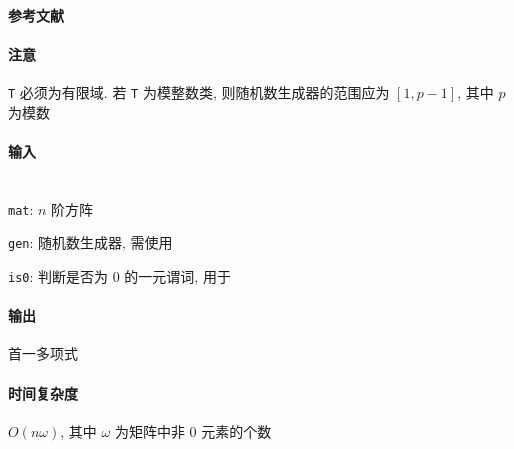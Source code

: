 \paragraph{参考文献} \cite{wiedemann1986solving}

\paragraph{注意} \verb|T| 必须为有限域. 若 \verb|T| 为模整数类, 则随机数生成器的范围应为 \([1, p-1]\), 其中 \(p\) 为模数

\paragraph{输入}~\\

\verb|mat|: \(n\) 阶方阵

\verb|gen|: 随机数生成器, 需使用 

\verb|is0|: 判断是否为 \(0\) 的一元谓词, 用于 

\paragraph{输出} 首一多项式

\paragraph{时间复杂度} \(O(n\omega)\), 其中 \(\omega\) 为矩阵中非 \(0\) 元素的个数

